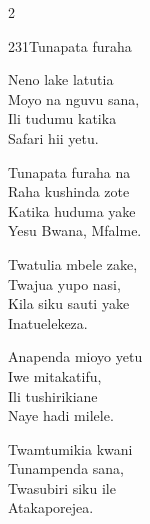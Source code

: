 \begin{multicols}{2}
\begin{hymn}{231}{Tunapata furaha}{}
\begin{stanza}
Neno lake latutia\\
Moyo na nguvu sana,\\
Ili tudumu katika\\
Safari hii yetu.
\end{stanza}
\begin{chorus}
Tunapata furaha na\\
Raha kushinda zote\\
Katika huduma yake\\
Yesu Bwana, Mfalme.
\end{chorus}
\begin{stanza}
Twatulia mbele zake,\\
Twajua yupo nasi,\\
Kila siku sauti yake\\
Inatuelekeza.
\end{stanza}
\begin{stanza}
Anapenda mioyo yetu\\
Iwe mitakatifu,\\
Ili tushirikiane\\
Naye hadi milele.
\end{stanza}
\begin{stanza}
Twamtumikia kwani\\
Tunampenda sana,\\
Twasubiri siku ile\\
Atakaporejea.
\end{stanza}
\end{hymn}


\end{multicols}
